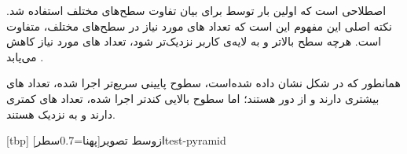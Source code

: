 
 اصطلاحی است که اولین بار توسط 
برای بیان تفاوت سطح‌های مختلف  استفاده شد. نکته اصلی این
مفهوم این است که تعداد ‌های مورد نیاز در سطح‌های مختلف، متفاوت
است. هرچه سطح  بالاتر و به لایه‌ی کاربر نزدیک‌تر شود، تعداد
‌های مورد نیاز کاهش می‌یابد .

همانطور که در شکل  نشان داده شده‌است، سطوح
پایینی  سریع‌تر اجرا شده، تعداد ‌های بیشتری دارند
و از  دور هستند؛ اما سطوح بالایی کندتر اجرا شده،
تعداد های کمتری دارند و به  نزدیک
هستند.

[tbp]
‌ازوسط
‌تصویر[پهنا=0.7‌سطر]{test-pyramid}


